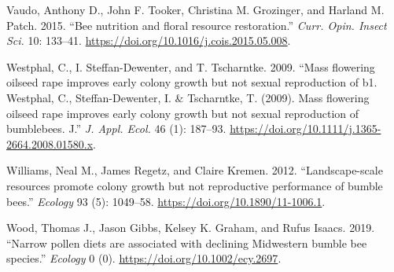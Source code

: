 \documentclass[11pt,]{article}
\begin{document}
\leavevmode\hypertarget{ref-Vaudo2015}{}%
Vaudo, Anthony D., John F. Tooker, Christina M. Grozinger, and Harland
M. Patch. 2015. ``Bee nutrition and floral resource restoration.''
\emph{Curr. Opin. Insect Sci.} 10: 133--41.
\url{https://doi.org/10.1016/j.cois.2015.05.008}.

\leavevmode\hypertarget{ref-Westphal2009a}{}%
Westphal, C., I. Steffan-Dewenter, and T. Tscharntke. 2009. ``Mass
flowering oilseed rape improves early colony growth but not sexual
reproduction of b1. Westphal, C., Steffan-Dewenter, I. \& Tscharntke, T.
(2009). Mass flowering oilseed rape improves early colony growth but not
sexual reproduction of bumblebees. J.'' \emph{J. Appl. Ecol.} 46 (1):
187--93. \url{https://doi.org/10.1111/j.1365-2664.2008.01580.x}.

\leavevmode\hypertarget{ref-Williams2012b}{}%
Williams, Neal M., James Regetz, and Claire Kremen. 2012.
``Landscape-scale resources promote colony growth but not reproductive
performance of bumble bees.'' \emph{Ecology} 93 (5): 1049--58.
\url{https://doi.org/10.1890/11-1006.1}.

\leavevmode\hypertarget{ref-Wood2019}{}%
Wood, Thomas J., Jason Gibbs, Kelsey K. Graham, and Rufus Isaacs. 2019.
``Narrow pollen diets are associated with declining Midwestern bumble
bee species.'' \emph{Ecology} 0 (0).
\url{https://doi.org/10.1002/ecy.2697}.
\end{document}
